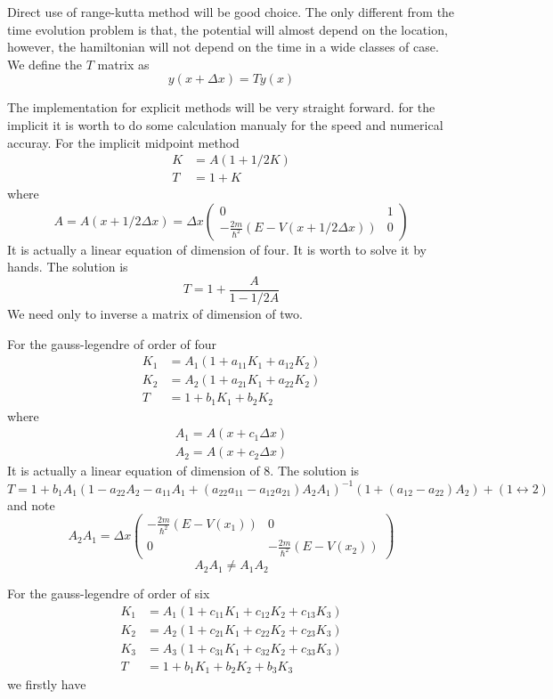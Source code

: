\documentclass[12pt,twoside]{article}
\begin{document}
Direct use of range-kutta method will be good choice.
The only different from the time evolution problem is that, the potential will almost depend on the location, however, the hamiltonian will not depend on the time in a wide classes of case.
We define the $T$ matrix as
$$
y(x +\Delta x) = T y(x)
$$

The implementation for explicit methods will be very straight forward. for the implicit it is worth to do some calculation manualy for the speed and numerical accuray.
For the implicit midpoint method
\begin{align*}
K &= A(1 + 1/2K)\\
T &= 1 + K
\end{align*}
where
$$
A = A(x+1/2\Delta x) =\Delta x \begin{pmatrix}  0 & 1 \\ -\frac{2m}{\hbar^2}(E-V(x+1/2\Delta x)) & 0 \end{pmatrix}
$$
It is actually a linear equation of dimension of four. It is worth to solve it by hands. The solution is
$$
T = 1 + \frac{A}{1 - 1/2A}
$$
We need only to inverse a matrix of dimension of two.

For the gauss-legendre of order of four
\begin{align*}
K_1 &= A_1(1 + a_{11} K_1 + a_{12} K_2)\\
K_2 &= A_2(1 + a_{21} K_1 + a_{22} K_2)\\
T &= 1 + b_1 K_1+ b_2 K_2
\end{align*}
where
\begin{align*}
A_1 = A(x + c_1\Delta x)\\
A_2 = A(x + c_2\Delta x)
\end{align*}
It is actually a linear equation of dimension of 8. The solution is
$$
T = 1 + b_1 A_1(1 - a_{22} A_2 - a_{11} A_1 + (a_{22} a_{11} - a_{12} a_{21})A_2 A_1)^{-1}(1+(a_{12}-a_{22})A_2) + (1\leftrightarrow 2)
$$
and note
$$
A_2 A_1 = \Delta x \begin{pmatrix}  -\frac{2m}{\hbar^2}(E-V(x_1)) & 0 \\ 0 & -\frac{2m}{\hbar^2}(E-V(x_2))  \end{pmatrix}
$$
$$
A_2 A_1 \neq A_1 A_2
$$

\iffalse
For the gauss-legendre of order of six
\begin{align*}
K_1 &= A_1(1 + c_{11} K_1 + c_{12} K_2+ c_{13} K_3)\\
K_2 &= A_2(1 + c_{21} K_1 + c_{22} K_2+ c_{23} K_3)\\
K_3 &= A_3(1 + c_{31} K_1 + c_{32} K_2 + c_{33} K_3)\\
T &= 1 + b_1 K_1+ b_2 K_2+b_3K_3
\end{align*}
we firstly have
\end{document}
